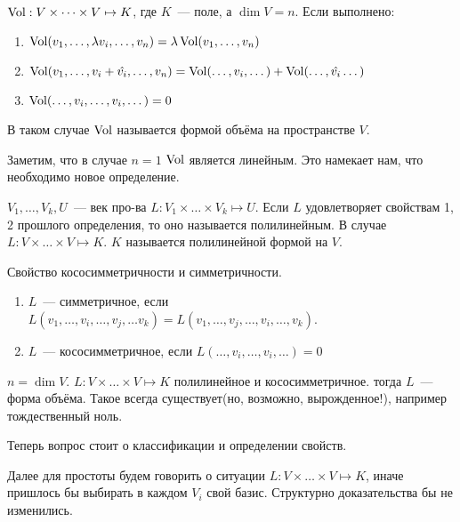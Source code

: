 \begin{definition}
    $\operatorname{Vol}: V\times \dots \times V \mapsto K$, где $K$~--- поле, а $\dim V = n$. Если выполнено:
    \begin{enumerate}
        \item $\operatorname{Vol}(v_1,\dots, \lambda v_i, \dots, v_n) = \lambda \operatorname{Vol}(v_1,\dots, v_n)$
        \item $\operatorname{Vol}(v_1,\dots, v_i + \hat{v_i}, \dots, v_n) = 
            \operatorname{Vol}(\dots, v_i, \dots ) + \operatorname{Vol}(\dots, \hat{v_i} \dots)$
        \item $\operatorname{Vol}(\dots, v_i, \dots, v_i, \dots) = 0$
    \end{enumerate}
    В таком случае $\operatorname{Vol}$ называется формой объёма на пространстве $V$.
\end{definition}
\begin{remark}
    Заметим, что в случае $n = 1$ $\operatorname{Vol}$ является линейным. Это намекает нам, что необходимо
    новое определение.
\end{remark}
\begin{definition}
    $V_1,\dots, V_k, U$~--- век про-ва $L: V_1\times\dots\times V_k\mapsto U$.
    Если $L$ удовлетворяет свойствам 1, 2 прошлого определения, то оно называется полилинейным.
    В случае $L: V\times\dots\times V\mapsto K$. $K$ называется полилинейной формой на $V$.
\end{definition}
\begin{definition}
    Свойство кососимметричности и симметричности.
     \begin{enumerate}
         \item $L$~--- симметричное, если $L(v_1,\dots, v_i, \dots, v_j, \dots v_k) = L(v_1,\dots, v_j,\dots, v_i,\dots, v_k)$.
         \item $L$~--- кососимметричное, если $L(\dots, v_i, \dots, v_i, \dots) = 0$
    \end{enumerate}
\end{definition}
\begin{definition}
    $n = \dim V$. $L: V\times\dots\times V \mapsto K$ полилинейное и кососимметричное.
    тогда $L$~--- форма объёма. Такое всегда существует(но, возможно, вырожденное!), например тождественный ноль.
\end{definition}
\begin{motivation}
    Теперь вопрос стоит о классификации и определении свойств.
\end{motivation}
Далее для простоты будем говорить о ситуации $L: V\times\dots\times V\mapsto K$, иначе
пришлось бы выбирать в каждом $V_i$ свой базис. Структурно доказательства бы не изменились.

